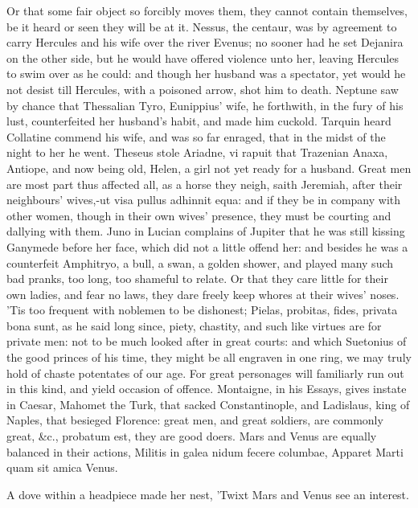 {Or that some fair object so forcibly moves them, they cannot contain
themselves, be it heard or seen they will be at it. Nessus, the
centaur, was by agreement to carry Hercules and his wife over the river
Evenus; no sooner had he set Dejanira on the other side, but he would
have offered violence unto her, leaving Hercules to swim over as he
could: and though her husband was a spectator, yet would he not desist
till Hercules, with a poisoned arrow, shot him to death. Neptune
saw by chance that Thessalian Tyro, Eunippius' wife, he forthwith, in
the fury of his lust, counterfeited her husband's habit, and made him
cuckold. Tarquin heard Collatine commend his wife, and was so far
enraged, that in the midst of the night to her he went. Theseus
stole Ariadne, vi rapuit that Trazenian Anaxa, Antiope, and now being
old, Helen, a girl not yet ready for a husband. Great men are most part
thus affected all, as a horse they neigh, saith Jeremiah, after
their neighbours' wives,-ut visa pullus adhinnit equa: and if they be
in company with other women, though in their own wives' presence, they
must be courting and dallying with them. Juno in Lucian complains of
Jupiter that he was still kissing Ganymede before her face, which did
not a little offend her: and besides he was a counterfeit Amphitryo, a
bull, a swan, a golden shower, and played many such bad pranks, too
long, too shameful to relate.
Or that they care little for their own ladies, and fear no laws, they
dare freely keep whores at their wives' noses. 'Tis too frequent with
noblemen to be dishonest; Pielas, probitas, fides, privata bona sunt,
as he said long since, piety, chastity, and such like virtues are
for private men: not to be much looked after in great courts: and which
Suetonius of the good princes of his time, they might be all engraven
in one ring, we may truly hold of chaste potentates of our age. For
great personages will familiarly run out in this kind, and yield
occasion of offence.  Montaigne, in his Essays, gives instate in
Caesar, Mahomet the Turk, that sacked Constantinople, and Ladislaus,
king of Naples, that besieged Florence: great men, and great soldiers,
are commonly great, \&c., probatum est, they are good doers. Mars and
Venus are equally balanced in their actions,
Militis in galea nidum fecere columbae,
Apparet Marti quam sit amica Venus.

A dove within a headpiece made her nest,
'Twixt Mars and Venus see an interest.

}
